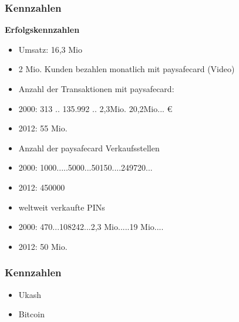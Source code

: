 \subsubsection{Kennzahlen}

\textbf{Erfolgskennzahlen}
\begin{itemize}
        \item Umsatz: 16,3 Mio
        \item 2 Mio. Kunden bezahlen monatlich mit paysafecard (Video)
        \item Anzahl der Transaktionen mit paysafecard:
        \item   2000: 313    ..  135.992   .. 2,3Mio.  20,2Mio... \euro{}
        \item   2012: 55 Mio.
        \item Anzahl der paysafecard Verkaufsstellen
        \item   2000: 1000.....5000...50150....249720...
        \item   2012: 450000
        \item weltweit verkaufte PINs
        \item   2000: 470...108242...2,3 Mio.....19 Mio....
        \item   2012: 50 Mio.
\end{itemize}


\subsubsection{Kennzahlen}

\begin{itemize}
        \item Ukash
        \item Bitcoin
\end{itemize}

